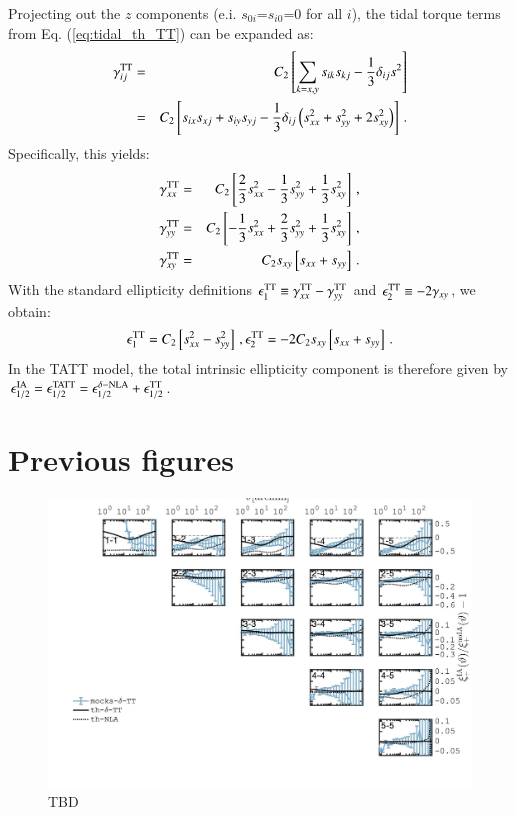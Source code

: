 \documentclass[useAMS,usenatbib]{mn2e}
\begin{document}
Projecting out the $z$ components (e.i. $s_{0i}$=$s_{i0}$=0 for all $i$),  the tidal torque terms from Eq. (\ref{eq:tidal_th_TT}) can be expanded as:
 \begin{eqnarray}
\gamma^{\rm TT}_{ij}&=& C_2 \left[\sum_{k=x,y} s_{ik} s_{kj} -\frac{1}{3} \delta_{ij} s^2\right] \\
                                  &=&C_2 \left[ s_{ix}s_{xj}  + s_{iy}s_{yj}  -  \frac{1}{3} \delta_{ij} \left( s_{xx}^2 + s_{yy}^2 +2s_{xy}^2 \right)  \right] \, .
\end{eqnarray}
Specifically, this yields:
 \begin{eqnarray}
\gamma^{\rm TT}_{xx}&=& C_2 \left[\frac{2}{3}s_{xx}^2  -  \frac{1}{3}s_{yy}^2 + \frac{1}{3}s_{xy}^2 \right]\, ,  \nonumber \\
\gamma^{\rm TT}_{yy}&=& C_2 \left[-\frac{1}{3}s_{xx}^2  +  \frac{2}{3}s_{yy}^2 + \frac{1}{3}s_{xy}^2  \right]\, , \\
\gamma^{\rm TT}_{xy}&=& C_2 s_{xy}\left[s_{xx}+s_{yy}  \right]\, . \nonumber                                  
\end{eqnarray}
With the standard ellipticity definitions $\epsilon_1^{\rm TT}\equiv \gamma_{xx}^{\rm TT} - \gamma_{yy}^{\rm TT}$ and $\epsilon_2^{\rm TT}\equiv -2 \gamma_{xy}$, we obtain:
\begin{eqnarray}
\epsilon_1^{\rm TT} = C_2  \left[ s_{xx}^2 - s_{yy}^2\right] \, , \epsilon_2^{\rm TT} = -2 C_2 s_{xy}\left[s_{xx}+s_{yy}  \right]\, .
\end{eqnarray}
In the TATT model, the total intrinsic ellipticity component is therefore given by $\epsilon_{1/2}^{\rm IA} = \epsilon_{1/2}^{\rm TATT} = \epsilon_{1/2}^{\delta{\rm-NLA}} + \epsilon_{1/2}^{\rm TT}$.


\section{Previous figures}




\begin{figure}
\includegraphics[width=\columnwidth]{graphs/frac_xip_C2_m1_skysim_deltaTT}
\caption{TBD}
\label{fig:xi_TT_m1}
\end{figure}

\bsp	%
\label{lastpage}
\end{document}
